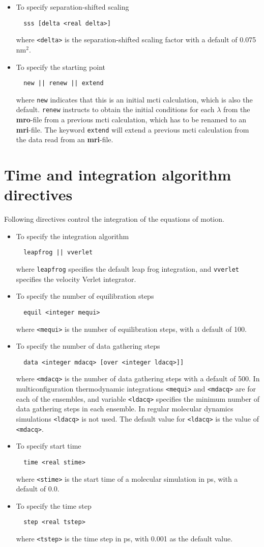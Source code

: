 \begin{itemize}
\item
To specify separation-shifted scaling
\begin{verbatim}
  sss [delta <real delta>]
\end{verbatim}
where \verb+<delta>+ is the separation-shifted scaling factor with a default
of 0.075 nm$^2$.
\item
To specify the starting point
\begin{verbatim}
  new || renew || extend
\end{verbatim}
where {\tt new} indicates that this is an initial mcti calculation, which
is also the default. {\tt renew} instructs to obtain the initial
conditions for each $\lambda$ from the {\bf mro}-file from a previous 
mcti calculation, which has to be renamed to an {\bf mri}-file. The
keyword {\tt extend} will extend a previous mcti calculation from the
data read from an {\bf mri}-file.
\end{itemize}

\section{Time and integration algorithm directives}
Following directives control the integration of the equations of motion.
\begin{itemize}
\item
To specify the integration algorithm
\begin{verbatim}
  leapfrog || vverlet
\end{verbatim}
where {\tt leapfrog} specifies the default leap frog integration, and
{\tt vverlet} specifies the velocity Verlet integrator.
\item
To specify the number of equilibration steps
\begin{verbatim}
  equil <integer mequi>
\end{verbatim}
where \verb+<mequi>+ is the number of equilibration steps, with a default
of 100.
\item
To specify the number of data gathering steps
\begin{verbatim}
  data <integer mdacq> [over <integer ldacq>]]
\end{verbatim}
where \verb+<mdacq>+ is the number of data gathering steps with a
default of 500. In multiconfiguration thermodynamic integrations
\verb+<mequi>+ and \verb+<mdacq>+ are for each of the ensembles, and
variable \verb+<ldacq>+ specifies the minimum number of data gathering steps 
in each ensemble. In regular molecular dynamics simulations \verb+<ldacq>+
is not used. The default value for \verb+<ldacq>+ is the value of \verb+<mdacq>+.
\item
To specify start time
\begin{verbatim}
  time <real stime>
\end{verbatim}
where \verb+<stime>+ is the start time of a molecular simulation in ps,
with a default of 0.0.
\item
To specify the time step
\begin{verbatim}
  step <real tstep>
\end{verbatim}
where \verb+<tstep>+ is the time step in ps, with 0.001 as the default value.
\end{itemize}

